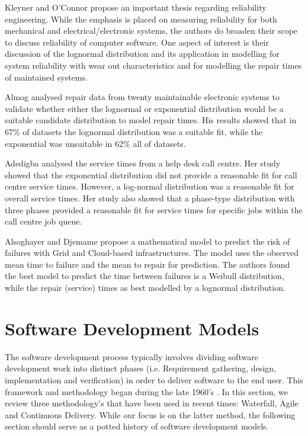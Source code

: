 Kleyner and O'Connor \cite{o2011practical} propose an important thesis regarding reliability engineering. While the emphasis is placed on measuring reliability for both mechanical and electrical/electronic systems, the authors do broaden their scope to discuss reliability of computer software. One aspect of interest is their discussion of the lognormal distribution and its application in modelling for system reliability with wear out characteristics and for modelling the repair times of maintained systems. \par

Almog \cite{almog1979study} analysed repair data from twenty maintainable electronic systems to validate whether either the lognormal or exponential distribution would be a suitable candidate distribution to model repair times. His results showed that in 67\% of datasets the lognormal distribution was a suitable fit, while the exponential was unsuitable in 62\% all of datasets. \par

Adedigba \cite{adedigba2005statistical} analysed the service times from a help desk call centre. Her study showed that the exponential distribution did not provide a reasonable fit for call centre service times. However, a log-normal distribution was a reasonable fit for overall service times. Her study also showed that a phase-type distribution with three phases provided a reasonable fit for service times for specific jobs within the call centre job queue. \par

Alsoghayer and Djemame \cite {alsoghayer2014resource} propose a mathematical model to predict the risk of failures with Grid and Cloud-based infrastructures. The model uses the observed mean time to failure and the mean to repair for prediction. The authors found the best model to predict the time between failures is a Weibull distribution, while the repair (service) times as best modelled by a lognormal distribution.

\section{Software Development Models}

The software development process typically involves dividing software development work into distinct phases (i.e. Requirement gathering, design, implementation and verification) in order to deliver software to the end user. This framework and methodology began during the late 1960's \cite{elliott2004global}. In this section, we review three methodology's that have been used in recent times: Waterfall, Agile and Continuous Delivery. While our focus is on the latter method, the following section should serve as a potted history of software development models. 

